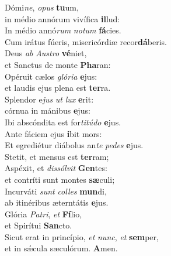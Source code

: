 \evenverse Dómi\textit{ne}, \textit{o}\textit{pus} \textbf{tu}um,~\*\\
\evenverse in médio annórum vivífica \textbf{il}lud:\\
\oddverse In médio annó\textit{rum} \textit{no}\textit{tum} \textbf{fá}cies.~\*\\
\oddverse Cum irátus fúeris, misericórdiæ recor\textbf{dá}beris.\\
\evenverse Deus \textit{ab} \textit{Au}\textit{stro} \textbf{vé}niet,~\*\\
\evenverse et Sanctus de monte \textbf{Pha}ran:\\
\oddverse Opéruit cælos \textit{gló}\textit{ri}\textit{a} \textbf{e}jus:~\*\\
\oddverse et laudis ejus plena est \textbf{ter}ra.\\
\evenverse Splendor e\textit{jus} \textit{ut} \textit{lux} \textbf{e}rit:~\*\\
\evenverse córnua in mánibus \textbf{e}jus:\\
\oddverse Ibi abscóndita est for\textit{ti}\textit{tú}\textit{do} \textbf{e}jus.~\*\\
\oddverse Ante fáciem ejus \textbf{i}bit mors:\\
\evenverse Et egrediétur diábolus an\textit{te} \textit{pe}\textit{des} \textbf{e}jus.~\*\\
\evenverse Stetit, et mensus est \textbf{ter}ram;\\
\oddverse Aspéxit, et \textit{dis}\textit{sól}\textit{vit} \textbf{Gen}tes:~\*\\
\oddverse et contríti sunt montes \textbf{sæ}culi;\\
\evenverse Incurváti \textit{sunt} \textit{col}\textit{les} \textbf{mun}di,~\*\\
\evenverse ab itinéribus æterntátis \textbf{e}jus.\\
\oddverse Glória \textit{Pa}\textit{tri}, \textit{et} \textbf{Fí}lio,~\*\\
\oddverse et Spirítui \textbf{San}cto.\\
\evenverse Sicut erat in princípio, \textit{et} \textit{nunc}, \textit{et} \textbf{sem}per,~\*\\
\evenverse et in sǽcula sæculórum. \textbf{A}men.\\
